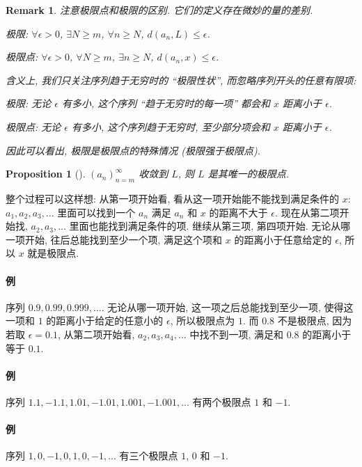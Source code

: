 \documentclass[UTF8]{ctexart}
\theoremstyle{mystyle}
\newtheorem{proposition}{Proposition}[section]
\theoremstyle{myremark}
\newtheorem*{remark}{Remark}
\theoremstyle{plain}
\begin{document}
\begin{remark}
    注意极限点和极限的区别. 它们的定义存在微妙的量的差别.

    极限: $ \forall \epsilon > 0 $, $ \exists N \geqslant m $, $ \forall n \geqslant N $, $ d(a_n, L) \leqslant \epsilon $.

    极限点: $ \forall \epsilon > 0 $, $ \forall N \geqslant m $, $ \exists n \geqslant N $, $ d(a_n, x) \leqslant \epsilon $.

    含义上, 我们只关注序列趋于无穷时的 ``极限性状'', 而忽略序列开头的任意有限项:

    极限: 无论 $ \epsilon $ 有多小, 这个序列 ``趋于无穷时的每一项'' 都会和 $ x $ 距离小于 $ \epsilon $.

    极限点: 无论 $ \epsilon $ 有多小, 这个序列趋于无穷时, 至少部分项会和 $ x $ 距离小于 $ \epsilon $.

    因此可以看出, 极限是极限点的特殊情况 (极限强于极限点). 
\end{remark}

\begin{proposition}[]
    $ (a_n)_{n = m}^\infty $ 收敛到 $ L $, 则 $ L $ 是其唯一的极限点.
\end{proposition}


整个过程可以这样想: 从第一项开始看, 看从这一项开始能不能找到满足条件的 $ x $: $ a_1, a_2, a_3, \dots $ 里面可以找到一个 $ a_n $ 满足 $ a_n $ 和 $ x $ 的距离不大于 $ \epsilon $. 现在从第二项开始找, $ a_2, a_3, \dots $ 里面也能找到满足条件的项. 继续从第三项, 第四项开始. 无论从哪一项开始, 往后总能找到至少一个项, 满足这个项和 $ x $ 的距离小于任意给定的 $ \epsilon $, 所以 $ x $ 就是极限点.


\paragraph{例}
序列 $ 0.9, 0.99, 0.999, \dots $. 无论从哪一项开始, 这一项之后总能找到至少一项, 使得这一项和 $ 1 $ 的距离小于给定的任意小的 $ \epsilon $, 所以极限点为 $ 1 $. 而 $ 0.8 $ 不是极限点, 因为若取 $ \epsilon = 0.1 $, 从第二项开始看, $ a_2, a_3, a_4, \dots $ 中找不到一项, 满足和 $ 0.8 $ 的距离小于等于 $ 0.1 $.

\paragraph{例}
序列 $ 1.1, -1.1, 1.01, -1.01, 1.001, -1.001, \dots $ 有两个极限点 $ 1 $ 和 $ -1 $.

\paragraph{例}
序列 $ 1, 0, -1, 0, 1, 0, -1, \dots $ 有三个极限点 $ 1 $, $ 0 $ 和 $ -1 $.
\end{document}
